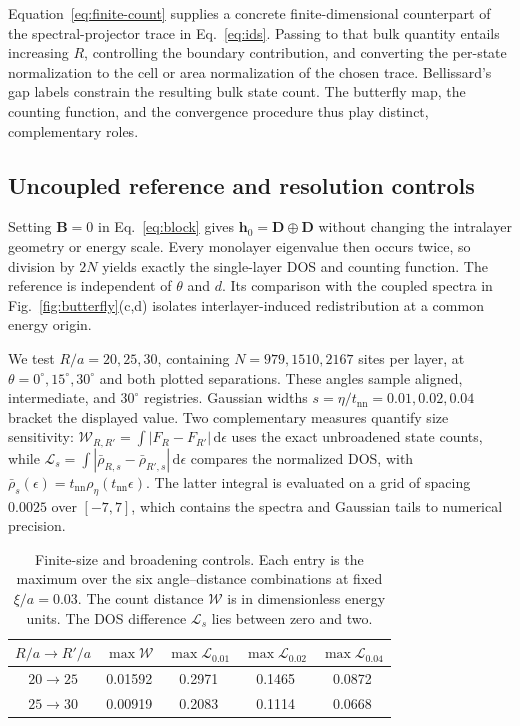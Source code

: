 \documentclass[11pt,a4paper]{article}
\newcommand{\dd}{\mathrm{d}}
\begin{document}
Equation~\eqref{eq:finite-count} supplies a concrete finite-dimensional counterpart of the spectral-projector trace in Eq.~\eqref{eq:ids}. Passing to that bulk quantity entails increasing $R$, controlling the boundary contribution, and converting the per-state normalization to the cell or area normalization of the chosen trace. Bellissard's gap labels constrain the resulting bulk state count. The butterfly map, the counting function, and the convergence procedure thus play distinct, complementary roles.

\subsection{Uncoupled reference and resolution controls}

Setting $\bm B=0$ in Eq.~\eqref{eq:block} gives $\bm h_0=\bm D\oplus\bm D$ without changing the intralayer geometry or energy scale. Every monolayer eigenvalue then occurs twice, so division by $2N$ yields exactly the single-layer DOS and counting function. The reference is independent of $\theta$ and $d$. Its comparison with the coupled spectra in Fig.~\ref{fig:butterfly}(c,d) isolates interlayer-induced redistribution at a common energy origin.

We test $R/a=20,25,30$, containing $N=979,1510,2167$ sites per layer, at $\theta=0^\circ,15^\circ,30^\circ$ and both plotted separations. These angles sample aligned, intermediate, and $30^\circ$ registries. Gaussian widths $s=\eta/t_{\mathrm{nn}}=0.01,0.02,0.04$ bracket the displayed value. Two complementary measures quantify size sensitivity: $\mathcal W_{R,R'}=\int|F_R-F_{R'}|\,\dd\epsilon$ uses the exact unbroadened state counts, while $\mathcal L_s=\int|\bar\rho_{R,s}-\bar\rho_{R',s}|\,\dd\epsilon$ compares the normalized DOS, with $\bar\rho_s(\epsilon)=t_{\mathrm{nn}}\rho_\eta(t_{\mathrm{nn}}\epsilon)$. The latter integral is evaluated on a grid of spacing $0.0025$ over $[-7,7]$, which contains the spectra and Gaussian tails to numerical precision.

\begin{table}[!ht]
 \centering
 \small
 \caption{Finite-size and broadening controls. Each entry is the maximum over the six angle--distance combinations at fixed $\xi/a=0.03$. The count distance $\mathcal W$ is in dimensionless energy units. The DOS difference $\mathcal L_s$ lies between zero and two.}
 \label{tab:resolution}
 \begin{tabular}{@{}ccccc@{}}
 \toprule
 $R/a\to R'/a$ & $\max\mathcal W$ & $\max\mathcal L_{0.01}$ & $\max\mathcal L_{0.02}$ & $\max\mathcal L_{0.04}$ \\
 \midrule
 $20\to25$ & 0.01592 & 0.2971 & 0.1465 & 0.0872 \\
 $25\to30$ & 0.00919 & 0.2083 & 0.1114 & 0.0668 \\
 \bottomrule
 \end{tabular}
\end{table}
\end{document}
